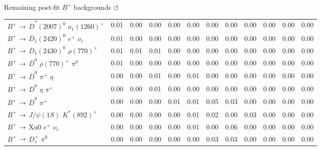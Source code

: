 \documentclass[xcolor=dvipsnames]{beamer}
\begin{document}
\begin{frame}{Remaining post-fit $B^+$ backgrounds \hyperlink{frame:A}{$\circlearrowleft$}}
{\begin{tabular}{lrrrrrrrrrrr}
      $B^{+}$ $\rightarrow$ $\overline{D}^{*}(2007)^{0}$ $a_{1}(1260)^{+}$         &         0.01 &         0.00 &         0.00 &         0.00 &         0.00 &         0.00 &         0.00 &         0.00 &         0.00 &         0.00 &         0.00 \\
      $B^{+}$ $\rightarrow$ $\overline{D}_{1}(2420)^{0}$ $e^{+}$ $\nu_{e}$         &         0.01 &         0.00 &         0.00 &         0.00 &         0.00 &         0.00 &         0.00 &         0.00 &         0.00 &         0.00 &         0.00 \\
      $B^{+}$ $\rightarrow$ $\overline{D}_{1}(2430)^{0}$ $\rho(770)^{+}$           &         0.01 &         0.01 &         0.01 &         0.00 &         0.00 &         0.00 &         0.00 &         0.00 &         0.00 &         0.00 &         0.00 \\
      $B^{+}$ $\rightarrow$ $\overline{D}^{0}$ $\rho(770)^{+}$ $\pi^{0}$           &         0.01 &         0.00 &         0.00 &         0.00 &         0.00 &         0.00 &         0.00 &         0.00 &         0.00 &         0.00 &         0.00 \\
      $B^{+}$ $\rightarrow$ $\overline{D}^{0}$ $\pi^{+}$ $\eta$                    &         0.00 &         0.00 &         0.01 &         0.00 &         0.01 &         0.00 &         0.00 &         0.00 &         0.00 &         0.00 &         0.00 \\
      $B^{+}$ $\rightarrow$ $\overline{D}^{0}$ $\eta$ $\pi^{+}$                    &         0.00 &         0.00 &         0.01 &         0.00 &         0.00 &         0.00 &         0.00 &         0.00 &         0.00 &         0.00 &         0.00 \\
      $B^{+}$ $\rightarrow$ $\overline{D}^{0}$ $\pi^{+}$                           &         0.00 &         0.00 &         0.00 &         0.01 &         0.01 &         0.05 &         0.03 &         0.00 &         0.00 &         0.00 &         0.00 \\
      $B^{+}$ $\rightarrow$ $J/\psi(1S)$ $K^{*}(892)^{+}$                          &         0.00 &         0.00 &         0.00 &         0.00 &         0.01 &         0.02 &         0.00 &         0.03 &         0.00 &         0.00 &         0.00 \\
      $B^{+}$ $\rightarrow$ Xu0 $e^{+}$ $\nu_{e}$                                  &         0.00 &         0.00 &         0.00 &         0.00 &         0.01 &         0.00 &         0.06 &         0.00 &         0.00 &         0.00 &         0.00 \\
      $B^{+}$ $\rightarrow$ $D_{s}^{+}$ $\pi^{0}$                                  &         0.00 &         0.00 &         0.00 &         0.00 &         0.00 &         0.03 &         0.03 &         0.00 &         0.00 &         0.00 &         0.00 \\

\end{tabular}}
\end{frame}
\end{document}
